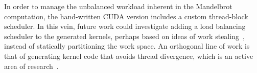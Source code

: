 In order to manage the unbalanced workload inherent in the Mandelbrot
computation, the hand-written CUDA version includes a custom thread-block
scheduler. In this vein, future work could investigate adding a load balancing
scheduler to the generated kernels, perhaps based on ideas of work
stealing~\cite{Randall:1998,Tzannes:2010il}, instead of statically partitioning
the work space. An orthogonal line of work is that of generating kernel code
that avoids thread divergence, which is an active area of
research~\cite{Zhang:2010jc}.

%
%
%

